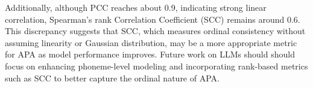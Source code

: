 \documentclass{article}
\begin{document}
Additionally, although PCC reaches about 0.9, indicating strong linear correlation, Spearman’s rank Correlation Coefficient (SCC) remains around 0.6. This discrepancy suggests that SCC, which measures ordinal consistency without assuming linearity or Gaussian distribution, may be a more appropriate metric for APA as model performance improves. Future work on LLMs should should focus on enhancing phoneme-level modeling and incorporating rank-based metrics such as SCC to better capture the ordinal nature of APA.


\vfill\pagebreak



\end{document}
